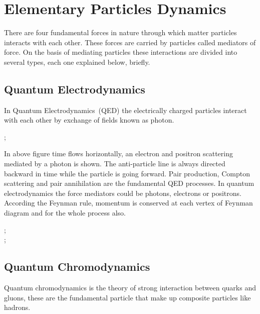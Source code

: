 \section{Elementary Particles Dynamics}
There are four fundamental forces in nature through which matter particles interacts with each other. These forces are carried by particles called mediators of force. On the basis of mediating particles these interactions are divided into several types, each one explained below, briefly.


\subsection{Quantum Electrodynamics}
In Quantum Electrodynamics~(QED) the electrically charged particles interact with each other by exchange of fields known as photon.\\
\begin{center}
;
\end{center}

In above figure time flows horizontally, an electron and positron scattering mediated by a photon is shown. The anti-particle line is always directed backward in time while the particle is going forward. Pair production, Compton scattering and pair annihilation are the fundamental QED processes.  In quantum electrodynamics the force mediators could be photons, electrons or positrons. According the Feynman rule, momentum is conserved at each vertex of Feynman diagram and for the whole process also. \\
\begin{center}
;\\

;
\end{center}
\subsection{Quantum Chromodynamics}
Quantum chromodynamics is the theory of strong interaction between quarks and gluons, these are the fundamental particle that make up composite particles like hadrons.


